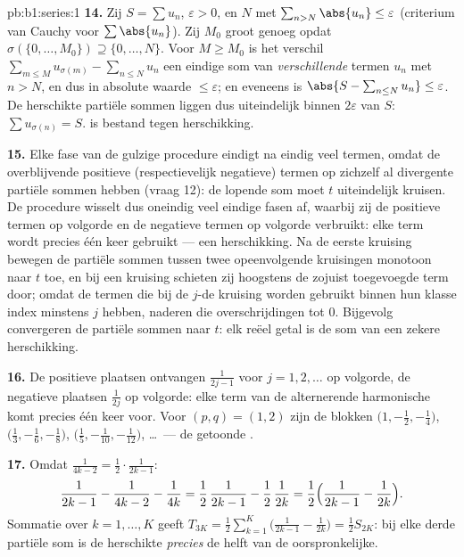 \begin{solution}{pb:b1:series:1}
\textbf{14.} Zij $S = \sum u_n$, $\varepsilon > 0$, en $N$ met
$\sum_{n > N} \abs{u_n} \leq \varepsilon$ (criterium van Cauchy
voor $\sum\abs{u_n}$). Zij $M_0$ groot genoeg opdat $\sigma(\{0,
\dots, M_0\}) \supseteq \{0, \dots, N\}$. Voor $M \geq M_0$ is het
verschil $\sum_{m \leq M} u_{\sigma(m)} - \sum_{n \leq N} u_n$ een
eindige som van \emph{verschillende} termen $u_n$ met $n > N$, en
dus in absolute waarde $\leq \varepsilon$; en eveneens is $\abs{S
- \sum_{n\leq N} u_n} \leq \varepsilon$. De herschikte partiële
sommen liggen dus uiteindelijk binnen $2\varepsilon$ van $S$:
$\sum u_{\sigma(n)} = S$.  is bestand tegen
herschikking.

\textbf{15.} Elke fase van de gulzige procedure eindigt na eindig
veel termen, omdat de overblijvende positieve (respectievelijk
negatieve) termen op zichzelf al divergente partiële sommen
hebben (vraag 12): de lopende som moet $t$ uiteindelijk kruisen.
De procedure wisselt dus oneindig veel eindige fasen af, waarbij
zij de positieve termen op volgorde en de negatieve termen op
volgorde verbruikt: elke term wordt precies één keer gebruikt ---
een herschikking. Na de eerste kruising bewegen de partiële
sommen tussen twee opeenvolgende kruisingen monotoon naar $t$
toe, en bij een kruising schieten zij hoogstens de zojuist
toegevoegde term door; omdat de termen die bij de $j$-de kruising
worden gebruikt binnen hun klasse index minstens $j$ hebben,
naderen die overschrijdingen tot $0$. Bijgevolg convergeren de
partiële sommen naar $t$: elk reëel getal is de som van een
zekere herschikking.

\textbf{16.} De positieve plaatsen ontvangen $\frac{1}{2j-1}$
voor $j = 1, 2, \dots$ op volgorde, de negatieve plaatsen
$\frac{1}{2j}$ op volgorde: elke term van de alternerende
harmonische  komt precies één keer voor. Voor $(p, q) = (1,
2)$ zijn de blokken $\bigl(1, -\frac12, -\frac14\bigr)$,
$\bigl(\frac13, -\frac16, -\frac18\bigr)$, $\bigl(\frac15,
-\frac1{10}, -\frac1{12}\bigr)$, \dots\ --- de getoonde .

\textbf{17.} Omdat $\frac{1}{4k-2} = \frac12\cdot\frac{1}{2k-1}$:
\[
\frac{1}{2k-1} - \frac{1}{4k-2} - \frac{1}{4k}
= \frac12\,\frac{1}{2k-1} - \frac12\,\frac{1}{2k}
= \frac12\Bigl(\frac{1}{2k-1} - \frac{1}{2k}\Bigr).
\]
Sommatie over $k = 1, \dots, K$ geeft $T_{3K} = \frac12
\sum_{k=1}^{K}\bigl(\frac{1}{2k-1} - \frac{1}{2k}\bigr) =
\frac12 S_{2K}$: bij elke derde partiële som is de herschikte
 \emph{precies} de helft van de oorspronkelijke.


\end{solution}

